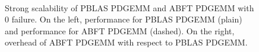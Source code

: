 \documentclass[pdftex,11pt]{article}
\begin{document}
\begin{figure}
  \begin{center}
    \mbox{
    }
  \end{center}
  \color{DodgerBlue4}
  \caption{\label{fig:perf04} \color{black} Strong scalability of
    PBLAS PDGEMM and ABFT PDGEMM with 0 failure.  On the left,
    performance for PBLAS PDGEMM (plain) and performance for ABFT
    PDGEMM (dashed).  On the right, overhead of ABFT PDGEMM with
    respect to PBLAS PDGEMM.  }
\end{figure}



\end{document}
